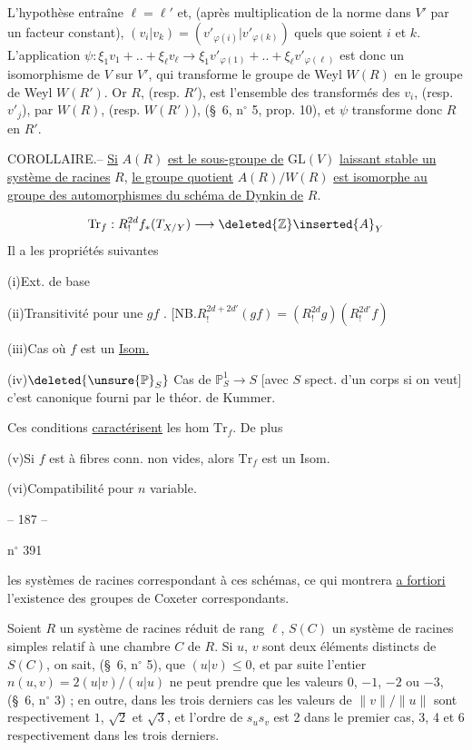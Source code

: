 L'hypothèse entraîne $\ell=\ell'$ et, (après multiplication de la norme dans $V'$
par un facteur constant), $(v_i|v_k)=(v'_{\varphi(i)}|v'_{\varphi(k)})$
quels que soient $i$ et $k$. L'application
$\psi:\xi_1v_1+..+\xi_\ell v_\ell\longrightarrow
\xi_1v'_{\varphi(1)}+..+\xi_\ell v'_{\varphi(\ell)}$
est donc un isomorphisme de $V$ sur $V'$, qui transforme le groupe de Weyl
$W(R)$ en le groupe de Weyl $W(R')$. Or $R$, (resp. $R'$),
est l'ensemble des transformés des $v_i$, (resp. $v'_j$), par $W(R)$,
(resp. $W(R')$), (\S\ 6, n$^\circ$ 5, prop. 10), et $\psi$ transforme donc
$R$ en $R'$.

COROLLAIRE.-- \uline{Si} $A(R)$ \uline{est le sous-groupe de}
$\mathrm{GL}(V)$ \uline{laissant stable un système de racines} $R$,
\uline{le groupe quotient} $A(R)/W(R)$ \uline{est isomorphe au groupe des
automorphismes du schéma de Dynkin de} $R$.

\[
\mathrm{Tr}_f:R^{2d}_!f_*(T_{X/Y})\longrightarrow
\deleted{\mathbb Z}\inserted{A}_Y
\]
Il a les propriétés suivantes

(i)\quad Ext. de base

(ii)\quad Transitivité pour une 
 $gf$ .
[NB.\quad $R^{2d+2d'}_!(gf)=(R^{2d}_!g)(R^{2d'}_!f)$

(iii)\quad Cas où $f$ est un \uline{Isom.}

(iv)\quad $\deleted{\unsure{\mathbb P}_S}$ Cas de $\mathbb P^1_S\longrightarrow S$
[avec $S$ spect. d'un corps si on veut] c'est
canonique fourni par le théor. de Kummer.

Ces conditions \uline{caractérisent} les hom $\mathrm{Tr}_f$.
De plus

(v)\quad Si $f$ est à fibres conn. non vides, alors $\mathrm{Tr}_f$
est un Isom.

(vi)\quad Compatibilité pour $n$ variable.


\begin{center}-- 187 --\end{center}
\hfill n$^\circ$ 391

les systèmes de racines correspondant à ces schémas, ce qui montrera \uline{a fortiori}
l'existence des groupes de Coxeter correspondants.

Soient $R$ un système de racines réduit de rang $\ell$, $S(C)$ un système
de racines simples relatif à une chambre $C$ de $R$. Si $u$, $v$ sont deux éléments
distincts de $S(C)$, on sait, (\S\ 6, n$^\circ$ 5), que $(u|v)\leq0$,
et par suite l'entier $n(u,v)=2(u|v)/(u|u)$ ne peut prendre que les valeurs
$0$, $-1$, $-2$ ou $-3$, (\S\ 6, n$^\circ$ 3) ; en outre, dans les trois derniers
cas les valeurs de $\|v\|/\|u\|$ sont respectivement $1$, $\sqrt2$ et $\sqrt3$,
et l'ordre de $s_us_v$ est 2 dans le premier cas, 3, 4 et 6 respectivement
dans les trois derniers.

